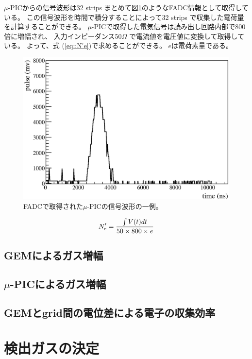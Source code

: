 $\mu$-PICからの信号波形は32 strips まとめて図\ref{fig::FADC_waveform}のようなFADC情報として取得している。
この信号波形を時間で積分することによって32 strips で収集した電荷量を計算することができる。
$\mu$-PICで取得した電気信号は読み出し回路内部で800倍に増幅され、
入力インピーダンス50$\Omega$ で電流値を電圧値に変換して取得している。
よって、式 (\ref{eq::N'e})で求めることができる。
$e$は電荷素量である。
\begin{figure}
  \centering
  \includegraphics[clip, width=0.7\columnwidth]{eps/0101_waveform_8.eps}
  \caption{FADCで取得された$\mu$-PICの信号波形の一例。}
  \label{fig::FADC_waveform}
\end{figure}
\begin{equation}
  N'_{\rm e} = \frac{\int V (t) dt}{ 50 \times 800 \times e}
  \label{eq::N'e}
\end{equation}

\subsection{GEMによるガス増幅}

\subsection{$\mu$-PICによるガス増幅}

\subsection{GEMとgrid間の電位差による電子の収集効率}

\section{検出ガスの決定}


%
%

